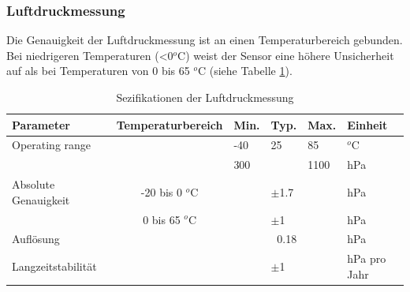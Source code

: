 \newpage

\subsubsection*{\textbf{Luftdruckmessung}}
Die Genauigkeit der Luftdruckmessung ist an einen Temperaturbereich gebunden. Bei niedrigeren Temperaturen (<0$^{o}$C) weist der Sensor eine höhere Unsicherheit auf als bei Temperaturen von 0 bis 65 $^{o}$C (siehe Tabelle \ref{tab:spez_druck}). \\
\begin{table}[htbp]
  \centering
  \caption{Sezifikationen der Luftdruckmessung \cite{Bosch2019}}
    \begin{tabular}{llllll}
    \toprule
    \textbf{Parameter} & \multicolumn{1}{l}{\textbf{Temperaturbereich}} & \multicolumn{1}{l}{\textbf{Min.}} & \textbf{Typ. } & \multicolumn{1}{l}{\textbf{Max.}} & \textbf{Einheit} \\
    \midrule
    Operating range &       & \multicolumn{1}{l}{-40} & 25    & \multicolumn{1}{l}{85} & $^{o}$C \\
          &       & 300   &       & 1100  & hPa \\
    Absolute Genauigkeit & \multicolumn{1}{c}{-20 bis 0 $^{o}$C} &       & $\pm$1.7 &       & hPa \\
          & \multicolumn{1}{c}{0 bis 65 $^{o}$C} &       & $\pm$1  &       & hPa \\
    Auflösung &       &       & \multicolumn{1}{r}{0.18} &       & hPa \\
    Langzeitstabilität &       &       & $\pm$1  &       & hPa pro Jahr \\
    \bottomrule
    \end{tabular}%
  \label{tab:spez_druck}%
\end{table}%

